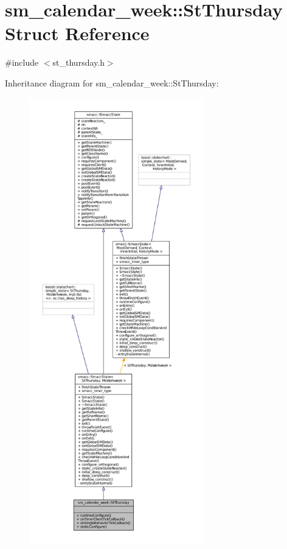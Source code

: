 \hypertarget{structsm__calendar__week_1_1StThursday}{}\section{sm\+\_\+calendar\+\_\+week\+:\+:St\+Thursday Struct Reference}
\label{structsm__calendar__week_1_1StThursday}


{\ttfamily \#include $<$st\+\_\+thursday.\+h$>$}



Inheritance diagram for sm\+\_\+calendar\+\_\+week\+:\+:St\+Thursday\+:
\nopagebreak
\begin{figure}[H]
\begin{center}
\leavevmode
\includegraphics[height=550pt]{structsm__calendar__week_1_1StThursday__inherit__graph}
\end{center}
\end{figure}


